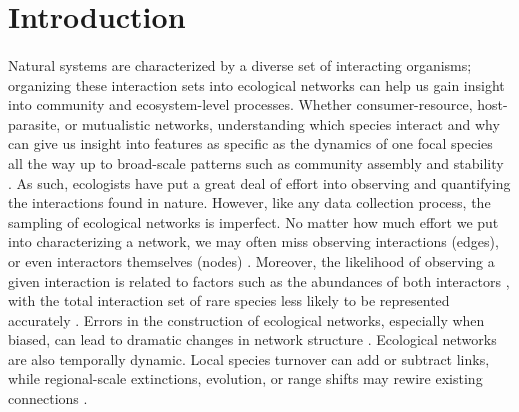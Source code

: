 \documentclass[openacc]{rsproca_new}%
\begin{document}
\linenumbers













\clearpage 

\section*{Introduction}

\paragraph*{}
Natural systems are characterized by a diverse set of interacting organisms; organizing these interaction sets into ecological networks can help us gain insight into community and ecosystem-level processes. Whether consumer-resource, host-parasite, or mutualistic networks, understanding which species interact and why can give us insight into features as specific as the dynamics of one focal species all the way up to broad-scale patterns such as community assembly and stability \cite{guimaraes2020structure, saravia2022ecological}. As such, ecologists have put a great deal of effort into observing and quantifying the interactions found in nature. However, like any data collection process, the sampling of ecological networks is imperfect. No matter how much effort we put into characterizing a network, we may often miss observing interactions (edges), or even interactors themselves (nodes) \cite{Young21}. Moreover, the likelihood of observing a given interaction is related to factors such as the abundances of both interactors \cite{canard2014empirical}, with the total interaction set of rare species less likely to be represented accurately \cite{cirtwill2019quantitative, olesen2011missing}. Errors in the construction of ecological networks, especially when biased, can lead to dramatic changes in network structure \cite{bluthgen2008, Young21}. Ecological networks are also temporally dynamic. Local species turnover can add or subtract links, while regional-scale extinctions, evolution, or range shifts may rewire existing connections \cite{olesen2011}. 
\end{document}
